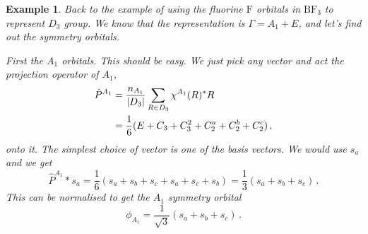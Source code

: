 \documentclass{article}
\theoremstyle{plain}\theoremheaderfont{\normalfont\itshape}\theorembodyfont{\rmfamily}\theoremseparator{.}\newtheorem*{rem}{Remark}\newtheorem*{ex}{Example}\newtheorem*{proof}{Proof}\newtheorem*{altp}{Alternative proof}
\theoremstyle{plain}\theoremheaderfont{\normalfont\bfseries}\theorembodyfont{\rmfamily}\theoremseparator{.}\newtheorem{thm}{Theorem}[section]\newtheorem{lem}[thm]{Lemma}\newtheorem{prop}[thm]{Proposition}\newtheorem*{cor}{Corollary}\newtheorem{defn}[thm]{Definition}\newtheorem{clm}[thm]{Claim}\newtheorem{clminproof}{Claim}\newtheorem*{law}{Law}\newtheorem{pos}[thm]{Postulate}
\theoremstyle{break}\theoremheaderfont{\normalfont\itshape}\theorembodyfont{\rmfamily}\theoremseparator{.\medskip}\newtheorem*{proofskip}{Proof}\newtheorem*{exs}{Examples}\newtheorem*{rems}{Remarks}
\theoremstyle{break}\theoremheaderfont{\normalfont\bfseries}\theorembodyfont{\rmfamily}\theoremseparator{.\medskip}\newtheorem{lemskip}[thm]{Lemma}\newtheorem{defnskip}[thm]{Definition}\newtheorem{propskip}[thm]{Proposition}\newtheorem{thmskip}[thm]{Theorem}
\numberwithin{equation}{section}
\newcommand{\abs}[1]{\left| #1 \right|}
\begin{document}
    \begin{ex}
        Back to the example of using the fluorine \(\mathrm{F}\) orbitals in \(\mathrm{BF_3}\) to represent \(D_3\) group. We know that the representation is \(\Gamma=A_1+E\), and let's find out the symmetry orbitals.
        
        First the \(A_1\) orbitals. This should be easy. We just pick any vector and act the projection operator of \(A_1\),
        \begin{align}
            \hat{P}^{A_1}&=\frac{n_{A_1}}{\abs{D_3}}\sum_{R\in D_3}\chi^{A_1}(R)^* R\notag\\
            &=\frac{1}{6}(E+C_3+C_3^2+C_2^a+C_2^b+C_2^c)\,,
        \end{align}
        onto it. The simplest choice of vector is one of the basis vectors. We would use \(s_a\) and we get
        \begin{equation}
            \hat{P}^{A_1}*s_a=\frac{1}{6}(s_a+s_b+s_c+s_a+s_c+s_b)=\frac{1}{3}(s_a+s_b+s_c)\,.
        \end{equation}
        This can be normalised to get the \(A_1\) symmetry orbital
        \begin{equation}
            \phi_{A_1}=\frac{1}{\sqrt{3}}(s_a+s_b+s_c)\,.
        \end{equation}


\end{ex}
\end{document}
